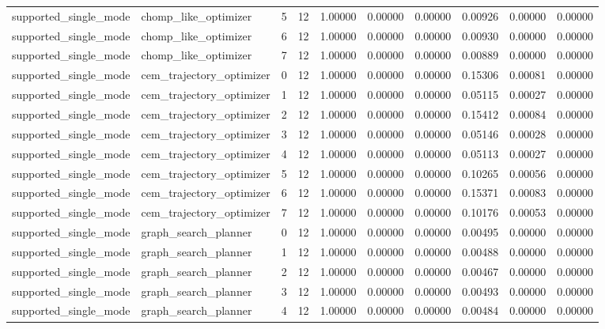 \documentclass{article}
\begin{document}
\begin{table}[tbp]
{\begin{tabular}{llllllllll}
supported\_single\_mode & chomp\_like\_optimizer & 5 & 12 & 1.00000 & 0.00000 & 0.00000 & 0.00926 & 0.00000 & 0.00000 \\
supported\_single\_mode & chomp\_like\_optimizer & 6 & 12 & 1.00000 & 0.00000 & 0.00000 & 0.00930 & 0.00000 & 0.00000 \\
supported\_single\_mode & chomp\_like\_optimizer & 7 & 12 & 1.00000 & 0.00000 & 0.00000 & 0.00889 & 0.00000 & 0.00000 \\
supported\_single\_mode & cem\_trajectory\_optimizer & 0 & 12 & 1.00000 & 0.00000 & 0.00000 & 0.15306 & 0.00081 & 0.00000 \\
supported\_single\_mode & cem\_trajectory\_optimizer & 1 & 12 & 1.00000 & 0.00000 & 0.00000 & 0.05115 & 0.00027 & 0.00000 \\
supported\_single\_mode & cem\_trajectory\_optimizer & 2 & 12 & 1.00000 & 0.00000 & 0.00000 & 0.15412 & 0.00084 & 0.00000 \\
supported\_single\_mode & cem\_trajectory\_optimizer & 3 & 12 & 1.00000 & 0.00000 & 0.00000 & 0.05146 & 0.00028 & 0.00000 \\
supported\_single\_mode & cem\_trajectory\_optimizer & 4 & 12 & 1.00000 & 0.00000 & 0.00000 & 0.05113 & 0.00027 & 0.00000 \\
supported\_single\_mode & cem\_trajectory\_optimizer & 5 & 12 & 1.00000 & 0.00000 & 0.00000 & 0.10265 & 0.00056 & 0.00000 \\
supported\_single\_mode & cem\_trajectory\_optimizer & 6 & 12 & 1.00000 & 0.00000 & 0.00000 & 0.15371 & 0.00083 & 0.00000 \\
supported\_single\_mode & cem\_trajectory\_optimizer & 7 & 12 & 1.00000 & 0.00000 & 0.00000 & 0.10176 & 0.00053 & 0.00000 \\
supported\_single\_mode & graph\_search\_planner & 0 & 12 & 1.00000 & 0.00000 & 0.00000 & 0.00495 & 0.00000 & 0.00000 \\
supported\_single\_mode & graph\_search\_planner & 1 & 12 & 1.00000 & 0.00000 & 0.00000 & 0.00488 & 0.00000 & 0.00000 \\
supported\_single\_mode & graph\_search\_planner & 2 & 12 & 1.00000 & 0.00000 & 0.00000 & 0.00467 & 0.00000 & 0.00000 \\
supported\_single\_mode & graph\_search\_planner & 3 & 12 & 1.00000 & 0.00000 & 0.00000 & 0.00493 & 0.00000 & 0.00000 \\
supported\_single\_mode & graph\_search\_planner & 4 & 12 & 1.00000 & 0.00000 & 0.00000 & 0.00484 & 0.00000 & 0.00000 \\

\end{tabular}}
\end{table}
\end{document}

